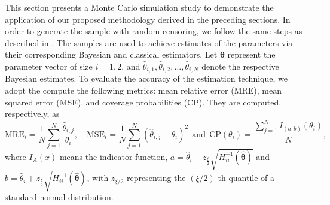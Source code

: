 This section presents a Monte Carlo simulation study to demonstrate the application of our proposed methodology derived in the preceding sections. In order to generate the sample with random censoring, we follow the same steps as described in \cite{ramos2020sampling}. The samples are used to achieve estimates of the parameters via their corresponding Bayesian and classical estimators. Let $\boldsymbol\theta$ represent the parameter vector of size $i=1,2$, and $\hat\theta_{i,1},\hat\theta_{i,2},\ldots,\hat\theta_{i,N}$ denote the respective Bayesian estimates. To evaluate the accuracy of the estimation technique, we adopt the compute the following metrics: mean relative error (MRE), mean squared error (MSE), and coverage probabilities (CP). They are computed, respectively, as
\begin{equation*}%
\text{MRE}_i=\dfrac{1}{N}\sum_{j=1}^{N}\frac{\hat\theta_{i,j}}{\theta_i}, \quad \text{MSE}_i=\dfrac{1}{N}\sum_{j=1}^{N}\left(\hat\theta_{i,j}-\theta_i\right)^2  \ \ \text{and}  \ \ \text{CP}(\theta_i)=\dfrac{\sum_{j=1}^{N} I_{(a,b)}\left(\theta_i\right)}{N}, 
\end{equation*}
where $I_{A}(x)$ means the indicator function, $a=\hat{\theta}_i - z_{\frac{\xi}{2}}\sqrt{H^{-1}_{ii}(\hat{\boldsymbol{\theta}})}$ and $b=\hat{\theta}_i + z_{\frac{\xi}{2}}\sqrt{H^{-1}_{ii}(\hat{\boldsymbol{\theta}})}$, with $z_{\xi/2}$ representing the $\left(\xi/2\right)$-th quantile of a standard normal distribution. 


